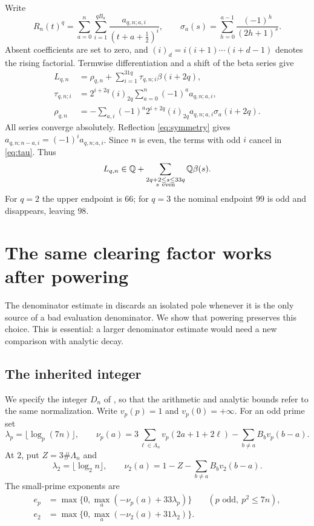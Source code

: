 \documentclass[11pt]{article}
\theoremstyle{remark}
\newcommand{\Q}{\mathbb Q}
\numberwithin{equation}{section}
\begin{document}
Write
\[
 R_n(t)^q=\sum_{a=0}^n\sum_{i=1}^{qB_a}
               \frac{a_{q,n;a,i}}{(t+a+\tfrac12)^i},
 \qquad
 \sigma_a(s)=\sum_{h=0}^{a-1}\frac{(-1)^h}{(2h+1)^s}.
\]
Absent coefficients are set to zero, and
$(i)_d=i(i+1)\cdots(i+d-1)$ denotes the rising factorial.
Termwise differentiation and a shift of the beta series give
\begin{align}
 L_{q,n}&=\rho_{q,n}+\sum_{i=1}^{31q}\tau_{q,n;i}\beta(i+2q),
                                                       \label{eq:betaform}\\
 \tau_{q,n;i}&=2^{i+2q}(i)_{2q}
                         \sum_{a=0}^n(-1)^a a_{q,n;a,i},
                                                       \label{eq:tau}\\
 \rho_{q,n}&=-\sum_{a,i}(-1)^a2^{i+2q}(i)_{2q}
                         a_{q,n;a,i}\sigma_a(i+2q).     \label{eq:rho}
\end{align}
All series converge absolutely. Reflection
\eqref{eq:symmetry} gives
$a_{q,n;n-a,i}=(-1)^i a_{q,n;a,i}$.
Since $n$ is even, the terms with odd $i$ cancel in
\eqref{eq:tau}. Thus
\begin{equation}\label{eq:range}
 L_{q,n}\in\Q+\sum_{\substack{2q+2\le s\le 33q\\s\ {\rm even}}}
                                     \Q\beta(s).
\end{equation}
For $q=2$ the upper endpoint is $66$; for $q=3$ the nominal
endpoint $99$ is odd and disappears, leaving $98$.

\section{The same clearing factor works after powering}
\label{sec:arithmetic}

The denominator estimate in \cite{fifteen} discards an isolated
pole whenever it is the only source of a bad evaluation denominator.
We show that powering preserves this choice. This is essential:
a larger denominator estimate would need a new comparison with
analytic decay.

\subsection{The inherited integer}

We specify the integer $D_n$ of \cite[Section~3 and Appendix~A]{fifteen},
so that the arithmetic and analytic bounds refer to the same
normalization. Write $v_p(p)=1$ and $v_p(0)=+\infty$.
For an odd prime set
\[
 \lambda_p=\lfloor\log_p(7n)\rfloor,\qquad
 \nu_p(a)=3\sum_{\ell\in\Lambda_n}v_p(2a+1+2\ell)
                   -\sum_{b\ne a}B_bv_p(b-a).
\]
At $2$, put $Z=3\#\Lambda_n$ and
\[
 \lambda_2=\lfloor\log_2 n\rfloor,\qquad
 \nu_2(a)=1-Z-\sum_{b\ne a}B_bv_2(b-a).
\]
The small-prime exponents are
\begin{align}
 e_p&=\max\{0,\max_a(-\nu_p(a)+33\lambda_p)\}
                     &&(p\text{ odd},\ p^2\le7n),       \label{eq:esmall}\\
 e_2&=\max\{0,\max_a(-\nu_2(a)+31\lambda_2)\}.            \label{eq:e2}
\end{align}
\end{document}
